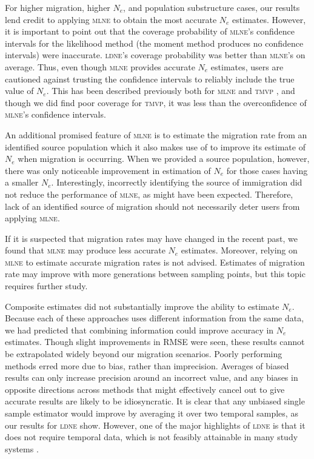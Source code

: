 For higher migration, higher $N_e$, and population substructure cases, our results 
lend credit to applying \textsc{mlne} to obtain the most accurate $N_e$ estimates. However, 
it is important to point out that the coverage probability of \textsc{mlne}'s confidence intervals 
for the likelihood method (the moment method produces no confidence
intervals) were inaccurate. \textsc{ldne}'s coverage probability was better than \textsc{mlne}'s 
on average. Thus, even though \textsc{mlne} provides accurate $N_e$ estimates, users are 
cautioned against trusting the confidence intervals to reliably include the true value of $N_e$. 
This has been described previously both for \textsc{mlne} and \textsc{tmvp} \citep{Tallmon:2004}, and 
though we did find poor coverage for \textsc{tmvp}, it was less than the overconfidence of 
\textsc{mlne}'s confidence intervals.

An additional promised feature of \textsc{mlne} is to estimate the migration rate from an 
identified source population which it also makes use of to improve its estimate of $N_e$ 
when migration is occurring. When we provided a source population, however, there was only noticeable 
improvement in estimation of $N_e$ for those cases having a smaller $N_e$. 
Interestingly, incorrectly identifying the source of immigration did not reduce the performance of 
\textsc{mlne}, as might have been expected. Therefore, lack of an identified source of migration 
should not necessarily deter users from applying \textsc{mlne}.

If it is suspected that migration rates may have changed in the recent past, we found that 
\textsc{mlne} may produce less accurate $N_e$ estimates. Moreover, relying on \textsc{mlne} 
to estimate accurate migration rates is not advised. Estimates of migration rate may improve with 
more generations between sampling points, but this topic requires further study.

Composite estimates did not substantially improve the ability to estimate $N_e$. 
Because each of these approaches uses different information from the same data, we had predicted 
that combining information could improve accuracy in $N_e$ estimates. Though slight 
improvements in RMSE were seen, these results cannot be extrapolated widely beyond our migration 
scenarios. Poorly performing methods erred more due to bias, rather than imprecision. Averages 
of biased results can only increase precision around an incorrect value, and any biases in 
opposite directions across methods that might effectively cancel out to give accurate results 
are likely to be idiosyncratic. It is clear that any unbiased single sample estimator would 
improve by averaging it over two temporal samples, as our results for \textsc{ldne} show. 
However, one of the major highlights of \textsc{ldne} is that it does not require temporal 
data, which is not feasibly attainable in many study systems \citep{Waples:2008}.


